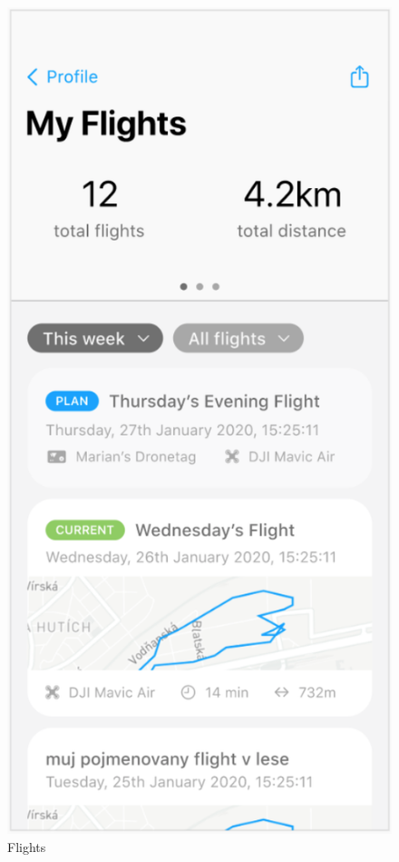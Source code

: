 \begin{figure}
\begin{minipage}{.4\textwidth}
        \includegraphics[width=.7\linewidth]{assets/user_interface_design/flight/flights.png}
        \caption{Flights}
        \label{fig:flights}
    \end{minipage}%
    \label{fig:flight_all}
\end{figure}
